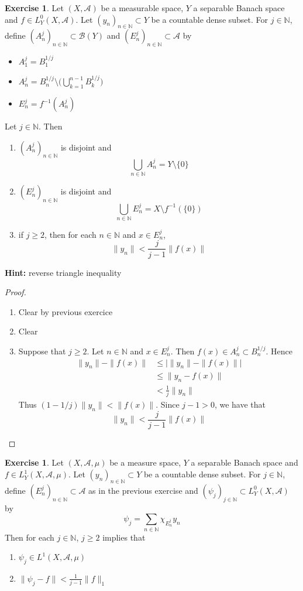 \documentclass[12pt]{amsart}
\theoremstyle{definition}
\newtheorem{ex}[definition]{Exercise}
\newcommand{\N}{\mathbb{N}}
\newcommand{\MA}{\mathcal{A}}
\newcommand{\MB}{\mathcal{B}}
\newcommand{\lex}[1]{\label{ex:#1}}
\begin{document}
	\begin{ex}
	Let $(X, \MA)$ be a measurable space, $Y$ a separable Banach space and $f \in L^0_Y(X, \MA)$.  Let $(y_n)_{n \in \N} \subset Y$ be a countable dense subset. For $j \in \N$, define $(A_n^j)_{n \in \N} \subset \MB(Y)$ and $(E_n^j)_{n \in \N} \subset \MA$ by  
	\begin{itemize}
			\item $A_1^j = B^{1/j}_1$ 
			\item $A_n^j = B^{1/j}_n  \setminus \bigg( \bigcup \limits_{k=1}^{n-1} B^{1/j}_k \bigg)$ 
			\item $E_n^j = f^{-1}(A^j_n)$ 
	\end{itemize}
	Let $j \in \N$. Then
	\begin{enumerate}
		\item $(A_n^j)_{n \in \N}$ is disjoint and $$\bigcup_{n \in \N}A_n^j = Y \setminus \{0\}$$
		\item $(E_n^j)_{n \in \N}$ is disjoint and $$\bigcup_{n \in \N}E_n^j = X \setminus f^{-1}(\{0\})$$
		\item if $j \geq 2$, then for each $n \in \N$ and $x \in E_n^j$, $$\|y_n\| < \frac{j}{j-1} \|f(x)\|$$
	\end{enumerate}
	\textbf{Hint:} reverse triangle inequality
	\end{ex}

	\begin{proof}\
		\begin{enumerate}
			\item Clear by previous exercice
			\item Clear
			\item Suppose that $j \geq 2$. Let $n \in \N$ and $x \in E_n^j$. Then $f(x) \in A_n^j \subset B_n^{1/j}$. Hence 
			\begin{align*}
				\|y_n\| - \|f(x)\|
				& \leq \bigg| \|y_n\| - \|f(x)\| \bigg| \\
				& \leq \|y_n - f(x)\| \\
				& < \frac{1}{j} \|y_n\|
			\end{align*}
			Thus $(1 - 1/j) \|y_n\| < \|f(x)\|$. Since $j-1 > 0$, we have that $$\|y_n\| < \frac{j}{j-1} \|f(x)\|$$
		\end{enumerate}
	\end{proof}
	
	\begin{ex} \lex{00000} 
	Let $(X, \MA, \mu)$ be a measure space, $Y$ a separable Banach space and $f \in L^1_Y(X, \MA, \mu)$. Let $(y_n)_{n \in \N} \subset Y$ be a countable dense subset. For $j \in \N$, define $(E_n^j)_{n \in \N} \subset \MA$ as in the previous exercise and $(\psi_j)_{j \in \N} \subset L^0_Y(X, \MA)$ by 
	$$\psi_j = \sum\limits_{n \in \N}\chi_{E_n^j}y_n$$  
	Then for each $j \in \N$, $j \geq 2$ implies that 
	\begin{enumerate}
		\item $\psi_j \in L^1(X, \MA, \mu)$ 
		\item $\|\psi_j - f\| < \frac{1}{j - 1} \|f\|_1$
	\end{enumerate}
	\end{ex}
	
\end{document}
